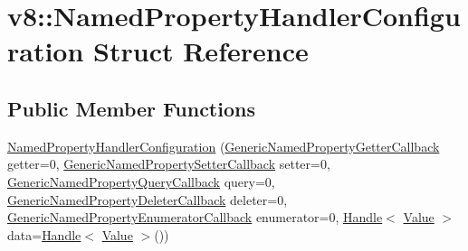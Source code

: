 \hypertarget{structv8_1_1_named_property_handler_configuration}{}\section{v8\+:\+:Named\+Property\+Handler\+Configuration Struct Reference}
\label{structv8_1_1_named_property_handler_configuration}
\subsection*{Public Member Functions}
\begin{DoxyCompactItemize}
\item 
\hyperlink{structv8_1_1_named_property_handler_configuration_abddcee65aa4cee085c5412384f41d076}{Named\+Property\+Handler\+Configuration} (\hyperlink{namespacev8_a24b1801fa53a7c5a71366d8044927563}{Generic\+Named\+Property\+Getter\+Callback} getter=0, \hyperlink{namespacev8_af74716c6e95a269c6cd4314662fd0a7e}{Generic\+Named\+Property\+Setter\+Callback} setter=0, \hyperlink{namespacev8_add9f7ab11e4a9a2b9ad2c4536b0e1a64}{Generic\+Named\+Property\+Query\+Callback} query=0, \hyperlink{namespacev8_ad2aecc0406ea4bc02d5a4f84a433b273}{Generic\+Named\+Property\+Deleter\+Callback} deleter=0, \hyperlink{namespacev8_a20826eb7e52e84fa4f632534e8eddd04}{Generic\+Named\+Property\+Enumerator\+Callback} enumerator=0, \hyperlink{classv8_1_1_handle}{Handle}$<$ \hyperlink{classv8_1_1_value}{Value} $>$ data=\hyperlink{classv8_1_1_handle}{Handle}$<$ \hyperlink{classv8_1_1_value}{Value} $>$())
\end{DoxyCompactItemize}
